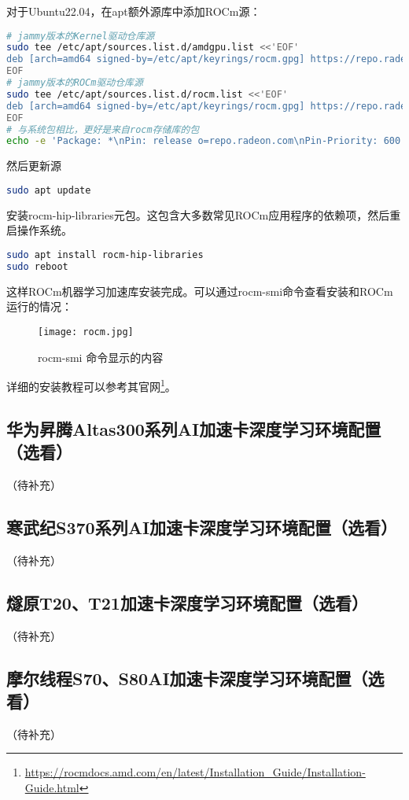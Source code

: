 \documentclass[lang=cn,a4paper,newtx]{elegantpaper}
\begin{document}
对于Ubuntu22.04，在apt额外源库中添加ROCm源：
\begin{lstlisting}[language=bash]
# jammy版本的Kernel驱动仓库源
sudo tee /etc/apt/sources.list.d/amdgpu.list <<'EOF'
deb [arch=amd64 signed-by=/etc/apt/keyrings/rocm.gpg] https://repo.radeon.com/amdgpu/5.7.1/ubuntu jammy main
EOF
# jammy版本的ROCm驱动仓库源
sudo tee /etc/apt/sources.list.d/rocm.list <<'EOF'
deb [arch=amd64 signed-by=/etc/apt/keyrings/rocm.gpg] https://repo.radeon.com/rocm/apt/debian jammy main
EOF
# 与系统包相比，更好是来自rocm存储库的包
echo -e 'Package: *\nPin: release o=repo.radeon.com\nPin-Priority: 600' | sudo tee /etc/apt/preferences.d/rocm-pin-600
\end{lstlisting} 

然后更新源
\begin{lstlisting}[language=bash]
sudo apt update
\end{lstlisting}

安装rocm-hip-libraries元包。这包含大多数常见ROCm应用程序的依赖项，然后重启操作系统。
\begin{lstlisting}[language=bash]
sudo apt install rocm-hip-libraries
sudo reboot
\end{lstlisting}

这样ROCm机器学习加速库安装完成。可以通过rocm-smi命令查看安装和ROCm运行的情况：
\begin{figure}[hbpt]
  \centering
  \texttt{[image: rocm.jpg]}
  \caption{rocm-smi 命令显示的内容}
  \label{fig:ubuntu-rocm-smi}
\end{figure}

详细的安装教程可以参考其官网\footnote{\url{https://rocmdocs.amd.com/en/latest/Installation_Guide/Installation-Guide.html}}。

\subsection{华为昇腾Altas300系列AI加速卡深度学习环境配置（选看）}
（待补充）
\subsection{寒武纪S370系列AI加速卡深度学习环境配置（选看）}
（待补充）
\subsection{燧原T20、T21加速卡深度学习环境配置（选看）}
（待补充）
\subsection{摩尔线程S70、S80AI加速卡深度学习环境配置（选看）}
（待补充）
\end{document}

